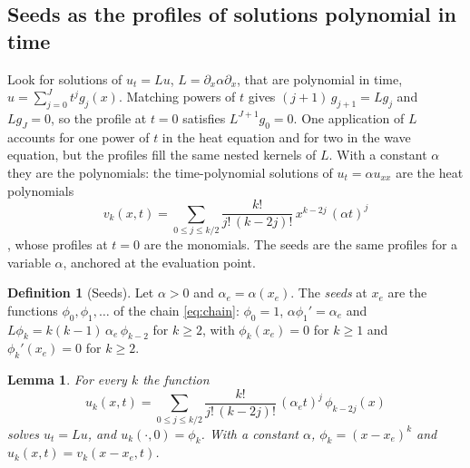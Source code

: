 \documentclass[11pt]{amsart}
\newtheorem{lemma}[theorem]{Lemma}
\theoremstyle{definition}
\newtheorem{definition}[theorem]{Definition}
\theoremstyle{remark}
\newcommand{\px}{\partial_x}
\begin{document}
\subsection{Seeds as the profiles of solutions polynomial in time}
\label{sec:chain}
Look for solutions of $u_t = L u$, $L = \px \alpha \px$, that are
polynomial in time, $u = \sum_{j = 0}^{J} t^j g_j(x)$. Matching powers of
$t$ gives $(j + 1)\, g_{j+1} = L g_j$ and $L g_J = 0$, so the profile at
$t = 0$ satisfies $L^{J+1} g_0 = 0$. One application of $L$ accounts for
one power of $t$ in the heat equation and for two in the wave equation, but
the profiles fill the same nested kernels of $L$. With a constant $\alpha$
they are the polynomials: the time-polynomial solutions of
$u_t = \alpha u_{xx}$ are the heat polynomials
\begin{equation*}
  v_k(x, t) = \sum_{0 \le j \le k/2} \frac{k!}{j!\, (k - 2j)!}\,
  x^{k - 2j}\, (\alpha t)^j
\end{equation*}
\cite{RosenbloomWidder1959,Widder1975}, whose profiles at $t = 0$ are the
monomials. The seeds are the same profiles for a variable $\alpha$,
anchored at the evaluation point.

\begin{definition}[Seeds]
\label{def:seeds}
Let $\alpha > 0$ and $\alpha_e = \alpha(x_e)$. The \emph{seeds} at $x_e$
are the functions $\phi_0, \phi_1, \ldots$ of the chain \eqref{eq:chain}:
$\phi_0 = 1$, $\alpha \phi_1' = \alpha_e$ and
$L \phi_k = k (k - 1)\, \alpha_e\, \phi_{k-2}$ for $k \ge 2$, with
$\phi_k(x_e) = 0$ for $k \ge 1$ and $\phi_k'(x_e) = 0$ for $k \ge 2$.
\end{definition}

\begin{lemma}
\label{lem:heatpoly}
For every $k$ the function
\begin{equation}
  \label{eq:heatpoly}
  u_k(x, t) = \sum_{0 \le j \le k/2} \frac{k!}{j!\, (k - 2j)!}\,
  (\alpha_e t)^j\, \phi_{k - 2j}(x)
\end{equation}
solves $u_t = L u$, and $u_k(\cdot, 0) = \phi_k$. With a constant
$\alpha$, $\phi_k = (x - x_e)^k$ and $u_k(x, t) = v_k(x - x_e, t)$.
\end{lemma}
\end{document}
